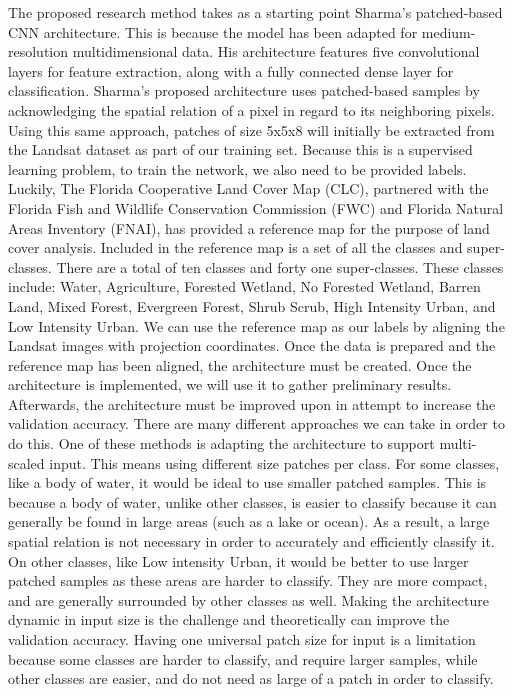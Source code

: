 \documentclass{article}
\begin{document}
The proposed research method takes as a starting point Sharma's patched-based CNN architecture. This is because the model has been adapted for medium-resolution multidimensional data. His architecture features five convolutional layers for feature extraction, along with a fully connected dense layer for classification. Sharma's proposed architecture uses patched-based samples by acknowledging the spatial relation of a pixel in regard to its neighboring pixels. Using this same approach, patches of size 5x5x8 will initially be extracted from the Landsat dataset as part of our training set. Because this is a supervised learning problem, to train the network, we also need to be provided labels. Luckily, The Florida Cooperative Land Cover Map (CLC), partnered with the Florida Fish and Wildlife Conservation Commission (FWC) and Florida Natural Areas Inventory (FNAI), has provided a reference map for the purpose of land cover analysis. Included in the reference map is a set of all the classes and super-classes. There are a total of ten classes and forty one super-classes. These classes include: Water, Agriculture, Forested Wetland, No Forested Wetland, Barren Land, Mixed Forest, Evergreen Forest, Shrub Scrub, High Intensity Urban, and Low Intensity Urban. We can use the reference map as our labels by aligning the Landsat images with projection coordinates. Once the data is prepared and the reference map has been aligned, the architecture must be created. Once the architecture is implemented, we will use it to gather preliminary results. Afterwards, the architecture must be improved upon in attempt to increase the validation accuracy. There are many different approaches we can take in order to do this. One of these methods is adapting the architecture to support multi-scaled input. This means using different size patches per class. For some classes, like a body of water, it would be ideal to use smaller patched samples. This is because a body of water, unlike other classes, is easier to classify because it can generally be found in large areas (such as a lake or ocean). As a result, a large spatial relation is not necessary in order to accurately and efficiently classify it. On other classes, like Low intensity Urban, it would be better to use larger patched samples as these areas are harder to classify. They are more compact, and are generally surrounded by other classes as well. Making the architecture dynamic in input size is the challenge and theoretically can improve the validation accuracy. Having one universal patch size for input is a limitation because some classes are harder to classify, and require larger samples, while other classes are easier, and do not need as large of a patch in order to classify. 
\end{document}
